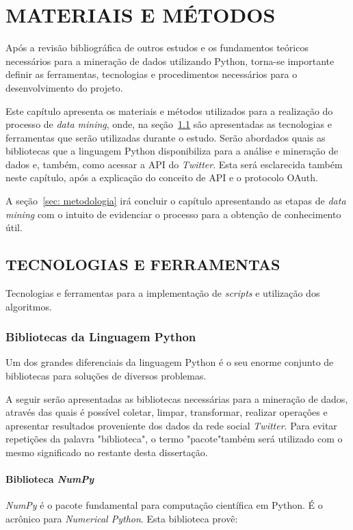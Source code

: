 \chapter{MATERIAIS E MÉTODOS}\label{ch:materiais-metodos}
Após a revisão bibliográfica de outros estudos e os fundamentos teóricos necessários para a mineração de dados utilizando Python, torna-se importante definir as ferramentas, tecnologias e procedimentos necessários para o desenvolvimento do projeto.

Este capítulo apresenta os materiais e métodos utilizados para a realização do processo de \textit{data mining}, onde, na seção~\ref{sec: tec-ferramenta} são apresentadas as tecnologias e ferramentas que serão utilizadas durante o estudo. Serão abordados quais as bibliotecas que a linguagem Python disponibiliza para a análise e mineração de dados e, também, como acessar a API do \textit{Twitter}. Esta será esclarecida também neste capítulo, após a explicação do conceito de API e o protocolo OAuth.

A seção~\ref{sec: metodologia} irá concluir o capítulo apresentando as etapas de \textit{data mining} com o intuito de evidenciar o processo para a obtenção de conhecimento útil.

\section{TECNOLOGIAS E FERRAMENTAS}\label{sec: tec-ferramenta}
Tecnologias e ferramentas para a implementação de \textit{scripts} e utilização dos algoritmos.

\subsection{Bibliotecas da Linguagem Python}\label{sec:bib_python}
Um dos grandes diferenciais da linguagem Python é o seu enorme conjunto de bibliotecas para soluções de diversos problemas.

A seguir serão apresentadas as bibliotecas necessárias para a mineração de dados, através das quais é possível coletar, limpar, transformar, realizar operações e apresentar resultados proveniente dos dados da rede social \textit{Twitter}. Para evitar repetições da palavra "biblioteca", o termo "pacote"\space também será utilizado com o mesmo significado no restante desta dissertação.
 
\subsubsection{Biblioteca \textit{NumPy}}
\textit{NumPy} é o pacote fundamental para computação científica em Python. É o acrônico para \textit{Numerical Python}. Esta biblioteca provê:

